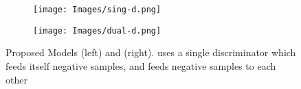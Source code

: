 
\usepackage{graphicx}
\usepackage{subcaption}

\begin{figure}[h]
\begin{subfigure}{.45\textwidth}
  \centering
  \texttt{[image: Images/sing-d.png]}
\end{subfigure}\hfill
\begin{subfigure}{.45\textwidth}
  \centering
  \texttt{[image: Images/dual-d.png]}
\end{subfigure}
\caption{Proposed Models \singd{} (left) and \duald{} (right). \textit{\singd{}} uses a single discriminator which feeds itself negative samples, and \textit{\duald{}} feeds negative samples to each other}
\label{fig:models}
\end{figure}

